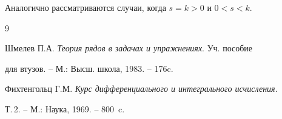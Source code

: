 Аналогично рассматриваются случаи, когда $s=k>0$ и $0<s<k$.








\begin{thebibliography}{9}







Шмелев П.А. {\em Теория рядов в задачах и упражнениях}. Уч. пособие


для втузов. -- М.: Высш. школа, 1983. -- 176c.




Фихтенгольц Г.М. {\em Курс дифференциального и интегрального исчисления}.


Т.\,2. -- М.: Наука, 1969. -- 800~c.





\end{thebibliography}





\vskip 0.5cm












\label{end}





